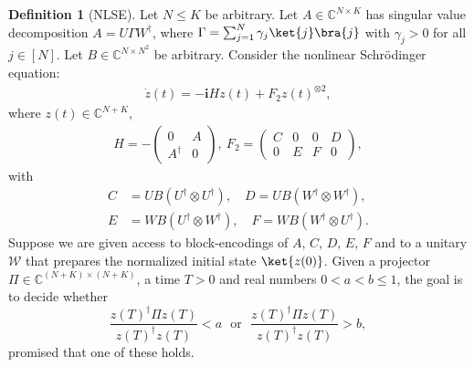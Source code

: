 \documentclass[superscriptaddress,onecolumn,nofootinbib,longbibliography,a4paper,accepted=2026-09-29]{quantumarticle}
\theoremstyle{plain}
\theoremstyle{definition}
\newtheorem{definition}[thm]{Definition}
\numberwithin{thm}{section}
\numberwithin{assumption}{section}
\numberwithin{lemma}{section}
\numberwithin{prop}{section}
\numberwithin{cor}{section}
\numberwithin{definition}{section}
\numberwithin{rmk}{section}
\numberwithin{equation}{section}
\renewcommand{\i}{\ensuremath{\mathbf{i}}}
\begin{document}
\begin{definition}[NLSE] 
Let $N \le K$ be arbitrary. Let $A \in \mathbb{C}^{N \times K}$ has singular value decomposition $A=U \Gamma W^\dagger$, where $\Gamma=\sum_{j=1}^N \gamma_j \ket{j}\bra{j}$ with $\gamma_j>0$ for all $j \in [N]$. Let $B \in \mathbb{C}^{N \times N^2}$ be arbitrary. Consider the nonlinear Schr\"{o}dinger equation:
\begin{align}
    \dot{z}(t)=-\i H z(t) + F_2 z(t)^{\otimes 2},
\end{align}
where $z(t) \in \mathbb{C}^{N+K}$, 
\begin{align}
H = -\begin{pmatrix}
0 & A \\
A^{\dagger} & 0
\end{pmatrix}, ~
F_2 =\begin{pmatrix}
    C & 0 & 0 & D \\
    0 & E & F & 0
\end{pmatrix},    
\end{align}
with 
\begin{align}
    C&=UB(U^\dagger \otimes U^\dagger),\quad 
    D=UB(W^\dagger \otimes W^\dagger), \\
    E&=WB(U^\dagger \otimes W^\dagger),\quad
    F=WB(W^\dagger \otimes U^\dagger).
\end{align}
Suppose we are given access to block-encodings of $A$, $C$, $D$, $E$, $F$ and to a unitary $\mathcal{W}$ that prepares the normalized initial state $\ket{z(0)}$. Given a projector $\Pi \in \mathbb{C}^{(N+K) \times (N+K)}$, a time $T>0$ and real numbers $0<a<b\le 1$, the goal is to decide whether 
$$\frac{z(T)^\dagger\Pi z(T)}{z(T)^\dagger z(T)}<a ~~~\mathrm{or}~~~\frac{z(T)^\dagger\Pi z(T)}{z(T)^\dagger z(T)}>b,$$
promised that one of these holds.
    
\end{definition}
\end{document}
